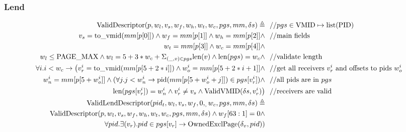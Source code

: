 \documentclass[a4paper]{article}
\let\Oldsubsubsection\subsubsection
\renewcommand{\subsubsection}{\FloatBarrier\Oldsubsubsection}
\newcommand*{\defined}{\triangleq}
\newcommand*{\PID}{\text{PID}}
\newcommand*{\VMID}{\text{VMID}}
\newcommand*{\PPMAX}{\text{PAGE\_MAX}}
\begin{document}
\subsubsection{Lend}

\begin{align*}
  \text{ValidDescriptor}(p,w_l,v_s,w_f,w_h,w_t,w_c,pgs,mm,\delta s)\defined &~~//pgs \in \VMID \mapsto \text{list}(\PID)\\
  v_{s}=\tv{mm[p[0]]} \land w_{f}=mm[p[1]] \land w_{h}=mm[p[2]] \land &~~//\text{main fields}\\
   w_{t} = mm[p[3]] \land w_{c} = mm[p[4]] \land &~~ \\
  w_l \le \PPMAX \land w_{l} = 5+3*w_{c} + \Sigma_{(\_,v)\in pgs} \text{len}(v) \land \text{len}(pgs)=w_{c} \land &~~//\text{validate length} \\
  \forall i. i < w_{c}\rightarrow \big(v_{r}^{i}=\tv{mm[p[5+2*i]]} \land w_{o}^{i} = mm[p[5+2*i+1]] \land &~~//\text{get all receivers $v_{r}^{i}$ and offsets to pids $w_{o}^{i}$ }\\
  w_{n}^{i}=mm[p[5+w_{o}^{i}]] \land (\forall j. j < w_{n}^{i}\rightarrow \text{pid}(mm[p[5+w_{o}^{i}+j]])\in pgs[v_{r}^{i}]) \land&~~//\text{all pids are in $pgs$}\\
  \text{len}(pgs[v_{r}^{i}])=w_{n}^{i}\land v_{r}^{i}\ne v_{s} \land \text{ValidVMID}(\delta s,v_{r}^{i})\big) &~~//\text{receivers are valid}
  \\
  \text{ValidLendDescriptor}(pid_t,w_l,v_{s},w_f,0,_,w_c,pgs,mm,\delta s) \defined & \\
  \text{ValidDescriptor}(p,w_l,v_s,w_f,w_h,w_t,w_c,pgs,mm,\delta s) \land w_f[63:1] = 0 \land& \\
   \forall pid. \exists (v_{r}). pid \in pgs[v_{r}] \rightarrow \text{OwnedExclPage}(\delta_v, pid))
  \end{align*}
\end{document}
